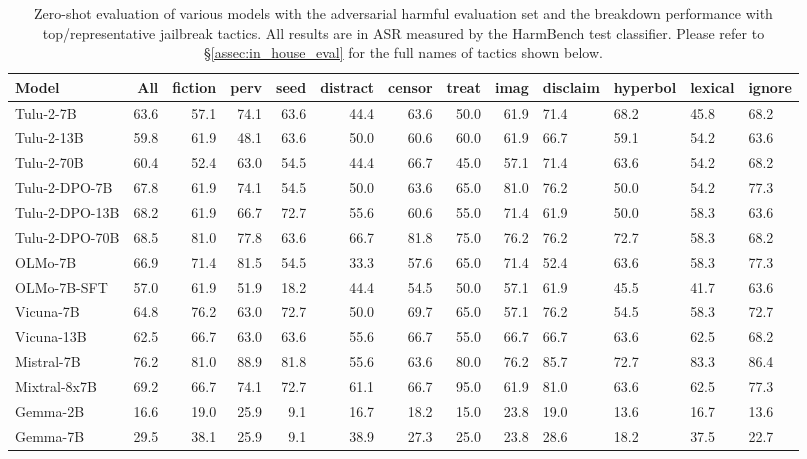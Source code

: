 
\begin{table}
    \centering
    \small

    \caption{Zero-shot evaluation of various models with the \dataset adversarial harmful evaluation set and the breakdown performance with top/representative jailbreak tactics. All results are in ASR measured by the HarmBench test classifier. Please refer to \S \ref{assec:in_house_eval} for the full names of tactics shown below.}
    \label{tab:eval_model_w_our_dataset}
    \hspace*{-4em}\begin{tabular}{l|rrrrrrrrllll}
        \toprule
         Model&  \textbf{All} &  fiction&  perv& seed& distract&censor & treat&imag&disclaim &hyperbol &lexical &ignore\\
         \midrule
         Tulu-2-7B&  63.6&  57.1&  74.1& 63.6& 44.4&63.6 & 50.0&61.9 &71.4 &68.2 &45.8 &68.2\\
         Tulu-2-13B&  59.8&  61.9&  48.1& 63.6& 50.0&60.6 & 60.0&61.9 &66.7 &59.1 &54.2 &63.6\\
         Tulu-2-70B&  60.4&  52.4&  63.0& 54.5& 44.4&66.7 & 45.0&57.1 &71.4 &63.6 &54.2 &68.2\\
         Tulu-2-DPO-7B&  67.8&  61.9&  74.1& 54.5& 50.0&63.6 & 65.0&81.0 &76.2 &50.0 &54.2 &77.3\\
         Tulu-2-DPO-13B&  68.2&  61.9&  66.7& 72.7& 55.6&60.6 & 55.0&71.4 &61.9 &50.0 &58.3 &63.6\\
         Tulu-2-DPO-70B&  68.5&  81.0&  77.8& 63.6& 66.7&81.8 & 75.0&76.2 &76.2 &72.7 &58.3 &68.2\\
         OLMo-7B&  66.9&  71.4&  81.5& 54.5& 33.3&57.6 & 65.0&71.4 &52.4 &63.6 &58.3 &77.3\\
         OLMo-7B-SFT&  57.0&  61.9&  51.9& 18.2& 44.4&54.5 & 50.0&57.1 &61.9 &45.5 &41.7 &63.6\\
         Vicuna-7B&  64.8&  76.2&  63.0& 72.7& 50.0&69.7 & 65.0&57.1 &76.2 &54.5 &58.3 &72.7\\
         Vicuna-13B& 62.5& 66.7& 63.0&63.6& 55.6&66.7 & 55.0&66.7 &66.7 &63.6 &62.5 &68.2\\
         Mistral-7B& 76.2& 81.0& 88.9&81.8& 55.6&63.6 & 80.0&76.2 &85.7 &72.7 &83.3 &86.4\\
         Mixtral-8x7B& 69.2& 66.7& 74.1&72.7& 61.1&66.7 & 95.0&61.9 &81.0 &63.6 &62.5 &77.3\\
         Gemma-2B& 16.6& 19.0& 25.9&9.1& 16.7&18.2 & 15.0&23.8 &19.0 &13.6 &16.7 &13.6\\
         Gemma-7B& 29.5& 38.1& 25.9&9.1& 38.9&27.3 & 25.0&23.8 &28.6 &18.2 &37.5 &22.7\\

\end{tabular}
\end{table}
